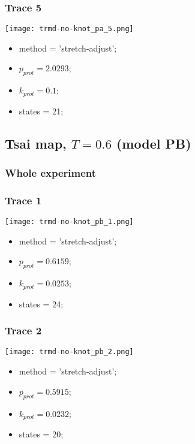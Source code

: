 \begin{minipage}[c]{0.45\textwidth}
\subsubsection{Trace 5}
\begin{minipage}[c]{0.7\textwidth}
    \texttt{[image: trmd-no-knot\_pa\_5.png]}
\end{minipage}
\hfill
\begin{minipage}[c]{0.45\textwidth}
    \begin{itemize}
        \item method = 'stretch-adjust';
        \item $p_{prot}=2.0293$;
        \item $k_{prot}=0.1$;
        \item states = 21;
    \end{itemize}
\end{minipage}

\subsection{Tsai map, $T=0.6$ (model PB)}
\subsubsection{Whole experiment}

\subsubsection{Trace 1}
\begin{minipage}[c]{0.7\textwidth}
    \texttt{[image: trmd-no-knot\_pb\_1.png]}
\end{minipage}
\hfill
\begin{minipage}[c]{0.45\textwidth}
    \begin{itemize}
        \item method = 'stretch-adjust';
        \item $p_{prot}=0.6159$;
        \item $k_{prot}=0.0253$;
        \item states = 24;
    \end{itemize}
\end{minipage}

\subsubsection{Trace 2}
\begin{minipage}[c]{0.7\textwidth}
    \texttt{[image: trmd-no-knot\_pb\_2.png]}
\end{minipage}
\hfill
\begin{minipage}[c]{0.45\textwidth}
    \begin{itemize}
        \item method = 'stretch-adjust';
        \item $p_{prot}=0.5915$;
        \item $k_{prot}=0.0232$;
        \item states = 20;
    \end{itemize}
\end{minipage}


\end{minipage}
